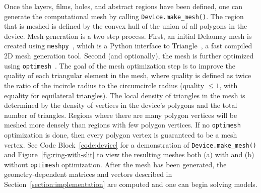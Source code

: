 \documentclass[final,3p,times]{elsarticle}
\newcommand{\inline}[1]{\texttt{#1}\xspace}
\newenvironment{code}{\captionsetup{type=listing}}{\hfill}
\begin{document}
Once the layers, films, holes, and abstract regions have been defined, one can generate the computational mesh by calling \inline{Device.make_mesh()}. The region that is meshed is defined by the convex hull of the union of all polygons in the device. Mesh generation is a two step process. First, an initial Delaunay mesh is created using \inline{meshpy}~\cite{Klockner}, which is a Python interface to Triangle~\cite{Shewchuk1996-va, Shewchuk}, a fast compiled 2D mesh generation tool. Second (and optionally), the mesh is further optimized using \inline{optimesh}~\cite{Schlomer2021-ua}. The goal of the mesh optimization step is to improve the quality of each triangular element in the mesh, where quality is defined as twice the ratio of the incircle radius to the circumcircle radius (quality $\leq1$, with equality for equilateral triangles). The local density of triangles in the mesh is determined by the density of vertices in the device's polygons and the total number of triangles. Regions where there are many polygon vertices will be meshed more densely than regions with few polygon vertices. If no \inline{optimesh} optimization is done, then every polygon vertex is guaranteed to be a mesh vertex. See Code Block~\ref{code:device} for a demonstration of \inline{Device.make_mesh()} and Figure~\ref{fig:ring-with-slit} to view the resulting meshes both (a) with and (b) without \inline{optimesh} optimization. After the mesh has been generated, the geometry-dependent matrices and vectors described in Section~\ref{section:implementation} are computed and one can begin solving models.


\end{document}
